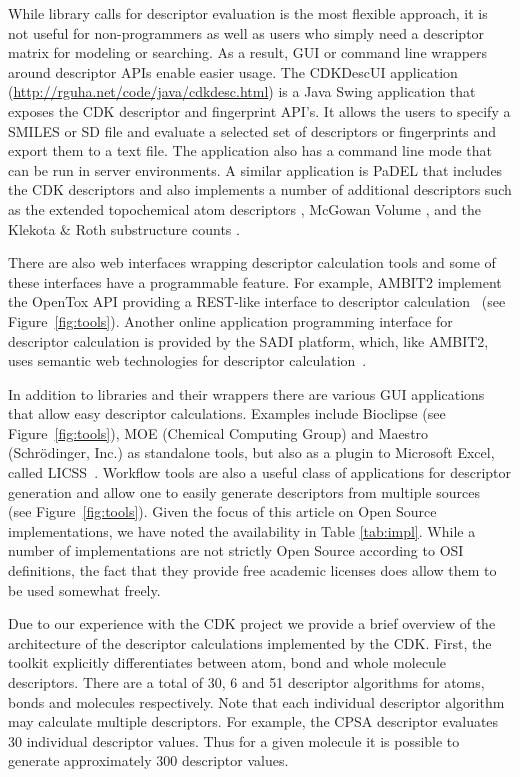 \documentclass[letterpaper, 12pt]{article}
\begin{document}
While library calls for descriptor evaluation is the most flexible
approach, it is not useful for non-programmers as well as users who
simply need a descriptor matrix for modeling or searching. As a
result, GUI or command line wrappers around descriptor APIs enable
easier usage. The CDKDescUI application
(\url{http://rguha.net/code/java/cdkdesc.html}) is a Java Swing
application that exposes the CDK descriptor and fingerprint API's. It
allows the users to specify a SMILES or SD file and evaluate a
selected set of descriptors or fingerprints and export them to a text
file. The application also has a command line mode that can be run in
server environments. A similar application is PaDEL \cite{Yap:2011fk}
that includes the CDK descriptors and also implements a number of
additional descriptors such as the extended topochemical atom
descriptors \cite{Roy:2004uq}, McGowan Volume \cite{Zhao:2003kx}, and
the Klekota \& Roth substructure counts \cite{Klekota:2008vn}.

There are also web interfaces wrapping descriptor calculation tools
and some of these interfaces have a programmable feature. For example,
AMBIT2 implement the OpenTox API providing a REST-like interface
to descriptor calculation~\cite{Jeliazkova2011,Hardy2010} (see Figure~\ref{fig:tools}). Another
online application programming interface for descriptor calculation
is provided by the SADI platform, which, like AMBIT2, uses semantic
web technologies for descriptor calculation~\cite{Chepelev2011b}.

In addition to libraries and their wrappers there are various GUI
applications that allow easy descriptor calculations. Examples include
Bioclipse \cite{Spjuth:2007aa} (see Figure~\ref{fig:tools}), MOE
(Chemical Computing Group) and Maestro (Schr\"{o}dinger, Inc.) as
standalone tools, but also as a plugin to Microsoft Excel, called
LICSS~\cite{Lawson2011}.  Workflow tools are also a useful class of
applications for descriptor generation and allow one to easily
generate descriptors from multiple sources~\cite{Truszkowski2011} (see
Figure~\ref{fig:tools}). Given the focus of this article on Open
Source implementations, we have noted the availability in Table
\ref{tab:impl}. While a number of implementations are not strictly
Open Source according to OSI definitions, the fact that they provide
free academic licenses does allow them to be used somewhat freely.

Due to our experience with the CDK project we provide a brief overview
of the architecture of the descriptor calculations implemented by the
CDK. First, the toolkit explicitly differentiates between atom, bond
and whole molecule descriptors. There are a total of 30, 6 and 51
descriptor algorithms for atoms, bonds and molecules respectively. Note that
each individual descriptor algorithm may calculate multiple descriptors. For example,
the CPSA descriptor evaluates 30 individual descriptor values. Thus for a given
molecule it is possible to generate approximately 300 descriptor
values.
\end{document}
